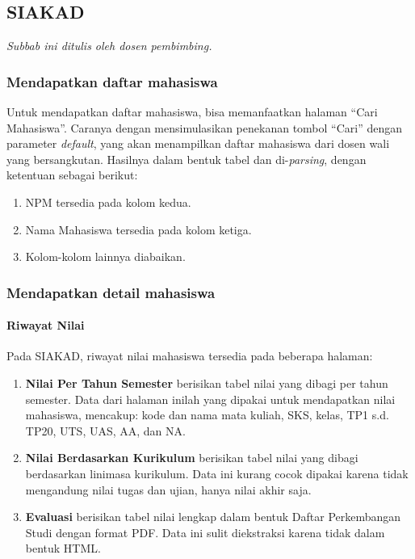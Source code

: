 \subsection{SIAKAD}

\textit{Subbab ini ditulis oleh dosen pembimbing.}

\subsubsection{Mendapatkan daftar mahasiswa}

Untuk mendapatkan daftar mahasiswa, bisa memanfaatkan halaman ``Cari Mahasiswa''. Caranya dengan mensimulasikan penekanan tombol ``Cari'' dengan parameter \textit{default}, yang akan menampilkan daftar mahasiswa dari dosen wali yang bersangkutan. Hasilnya dalam bentuk tabel dan di-\textit{parsing}, dengan ketentuan sebagai berikut:

\begin{enumerate}
    \item NPM tersedia pada kolom kedua.
    \item Nama Mahasiswa tersedia pada kolom ketiga.
    \item Kolom-kolom lainnya diabaikan.
\end{enumerate}

\subsubsection{Mendapatkan detail mahasiswa}

\paragraph{Riwayat Nilai} Pada SIAKAD, riwayat nilai mahasiswa tersedia pada beberapa halaman:

\begin{enumerate}
    \item \textbf{Nilai Per Tahun Semester} berisikan tabel nilai yang dibagi per tahun semester. Data dari halaman inilah yang dipakai untuk mendapatkan nilai mahasiswa, mencakup: kode dan nama mata kuliah, SKS, kelas, TP1 s.d. TP20, UTS, UAS, AA, dan NA.
    \item \textbf{Nilai Berdasarkan Kurikulum} berisikan tabel nilai yang dibagi berdasarkan linimasa kurikulum. Data ini kurang cocok dipakai karena tidak mengandung nilai tugas dan ujian, hanya nilai akhir saja.
    \item \textbf{Evaluasi} berisikan tabel nilai lengkap dalam bentuk Daftar Perkembangan Studi dengan format PDF. Data ini sulit diekstraksi karena tidak dalam bentuk HTML.
\end{enumerate}

